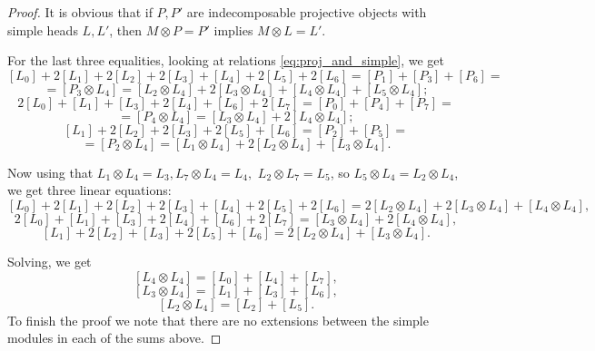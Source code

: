 \documentclass[10pt,a4paper]{amsart}
\begin{document}
    \begin{proof}
        It is obvious that if $P,P'$ are indecomposable projective objects with simple heads $L, L'$, then $M\otimes P = P'$ implies $M\otimes L=L'$. 
        
        For the last three equalities, looking at relations \ref{eq:proj_and_simple}, we get
        $$
        [L_0]+2[L_1]+2[L_2]+2[L_3]+[L_4]+2[L_5]+2[L_6] = [P_1]+[P_3]+[P_6] =
        $$
        $$
        =[P_3\otimes L_4] = [L_2\otimes L_4] + 2[L_3\otimes L_4] + [L_4\otimes L_4] + [L_5\otimes L_4];
        $$
        $$
        2[L_0] + [L_1] + [L_3]+2[L_4]+[L_6]+2[L_7] = [P_0]+[P_4]+[P_7] = 
        $$
        $$
        = [P_4\otimes L_4] = [L_3\otimes L_4]+2[L_4\otimes L_4];
        $$
        $$
        [L_1]+2[L_2]+2[L_3]+2[L_5]+[L_6]=[P_2]+[P_5] =
        $$
        $$
        =[P_2\otimes L_4] = [L_1\otimes L_4]+2[L_2\otimes L_4]+[L_3\otimes L_4].
        $$
        

        Now using that $L_1\otimes L_4 = L_3, L_7\otimes L_4 = L_4,$  $L_2\otimes L_7=L_5$, so $L_5\otimes L_4= L_2\otimes L_4$, we get three linear equations:
        $$
        [L_0]+2[L_1]+2[L_2]+2[L_3]+[L_4]+2[L_5]+2[L_6]  = 2[L_2\otimes L_4] + 2[L_3\otimes L_4] + [L_4\otimes L_4],
        $$
        $$
        2[L_0] + [L_1] + [L_3]+2[L_4]+[L_6]+2[L_7] = [L_3\otimes L_4]+2[L_4\otimes L_4],
        $$
        $$
        [L_1]+2[L_2]+[L_3]+2[L_5]+[L_6] = 2[L_2\otimes L_4]+[L_3\otimes L_4].
        $$

        Solving, we get
        $$
        [L_4\otimes L_4] = [L_0]+[L_4]+[L_7],
        $$
        $$
        [L_3\otimes L_4] = [L_1] + [L_3]+[L_6],
        $$
        $$
        [L_2\otimes L_4] = [L_2]+[L_5].
        $$
        To finish the proof we note that there are no extensions between the simple modules in each of the sums above.
    \end{proof}
\end{document}
